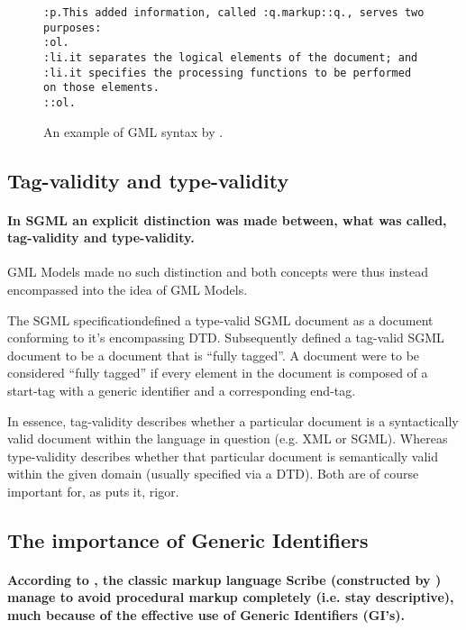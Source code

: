 \documentclass{scrreprt}
\begin{document}
\begin{figure}[h]
\centering
\begin{lstlisting}
:p.This added information, called :q.markup::q., serves two purposes: 
:ol.
:li.it separates the logical elements of the document; and 
:li.it specifies the processing functions to be performed on those elements. 
::ol.
\end{lstlisting}
\caption{An example of GML syntax by \citet{goldfarb}.}
\end{figure}




\subsection{Tag-validity and type-validity}
\label{sec:tag-validity-type-validity}

\paragraph{In SGML an explicit distinction was made between, what was called, tag-validity and type-validity.} GML Models made no such distinction and both concepts were thus instead encompassed into the idea of GML Models.

The SGML specification defined a type-valid SGML document as a document conforming to it's encompassing DTD. Subsequently defined a tag-valid SGML document to be a document that is ``fully tagged''. A document were to be considered ``fully tagged'' if every element in the document is composed of a start-tag with a generic identifier and a corresponding end-tag.

In essence, tag-validity describes whether a particular document is a syntactically valid document within the language in question (e.g. XML or SGML). Whereas type-validity describes whether that particular document is semantically valid within the given domain (usually specified via a DTD). Both are of course important for, as \citet{goldfarb} puts it, rigor.


\subsection{The importance of Generic Identifiers}
\label{sec:importance-of-generic-identifiers}
\paragraph{According to \citet{goldfarb}, the classic markup language Scribe (constructed by \citet{reid}) manage to avoid procedural markup completely (i.e. stay descriptive), much because of the effective use of Generic Identifiers (GI's).}
\end{document}
